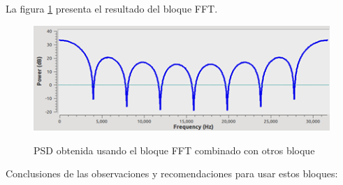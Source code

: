 La figura \ref{fig:la-PSD-FFT} presenta el resultado del bloque FFT.

\vspace{200px}
\begin{figure}[h!]
	\captionsetup{justification = raggedright, singlelinecheck = false}
	\caption{PSD obtenida usando el bloque FFT combinado con otros bloque} 
	\centering
	\includegraphics[scale=1]{Imagenes/PSD-FFT.png}
	\label{fig:la-PSD-FFT}
\end{figure}

Conclusiones de las observaciones y recomendaciones para usar estos bloques:

